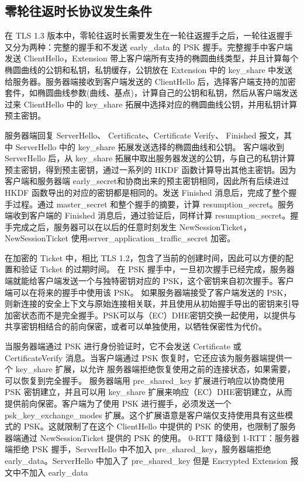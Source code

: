\subsection{零轮往返时长协议发生条件}

在 TLS 1.3 版本中，零轮往返时长需要发生在一轮往返握手之后，一轮往返握手又分为两种：完整的握手和不发送 early\_data 的 PSK 握手。完整握手中客户端发送 ClientHello，Extension 带上客户端所有支持的椭圆曲线类型，并且计算每个椭圆曲线的公钥和私钥，私钥缓存，公钥放在 Extension 中的 key\_share 中发送给服务器。服务器端接收到客户端发送的 ClientHello 后，选择客户端支持的加密套件，如椭圆曲线参数(曲线、基点)，计算自己的公钥和私钥，然后从客户端发送过来 ClientHello 中的 key\_share 拓展中选择对应的椭圆曲线公钥，并用私钥计算预主密钥。

服务器端回复 ServerHello、 Certificate、Certificate Verify、 Finished 报文，其中 ServerHello 中的 key\_share 拓展发送选择的椭圆曲线和公钥。
客户端收到 ServerHello 后，从 key\_share 拓展中取出服务器发送的公钥，与自己的私钥计算预主密钥，得到预主密钥，通过一系列的 HKDF 函数计算导出其他主密钥。因为客户端和服务器端 early\_secret和协商出来的预主密钥相同，因此所有后续进过 HKDF 函数导出的对应的密钥都是相同的。发送 Finished 消息后，完成了整个握手过程。通过 master\_secret 和整个握手的摘要，计算 resumption\_secret。服务端收到客户端的 Finished 消息后，通过验证后，同样计算 resumption\_secret。握手完成之后，服务器可以在以后的任意时刻发生 NewSessionTicket，NewSessionTicket 使用server\_application\_traffic\_secret 加密。

在加密的 Ticket 中，相比 TLS 1.2，包含了当前的创建时间，因此可以方便的配置和验证 Ticket 的过期时间。
在 PSK 握手中，一旦初次握手已经完成，服务器端就能给客户端发送一个与独特密钥对应的 PSK，这个密钥来自初次握手。客户端可以在将来的握手中使用该 PSK。 如果服务器端接受了客户端发送的 PSK，则新连接的安全上下文与原始连接相关联，并且使用从初始握手导出的密钥来引导加密状态而不是完全握手。PSK可以与（EC）DHE密钥交换一起使用，以提供与共享密钥相结合的前向保密，或者可以单独使用，以牺牲保密性为代价。

当服务器端通过 PSK 进行身份验证时，它不会发送 Certificate 或 CertificateVerify 消息。当客户端通过 PSK 恢复时，它还应该为服务器端提供一个 key\_share 扩展，以允许 服务器端拒绝恢复使用之前的连接状态，如果需要，可以恢复到完全握手。 服务器端用 pre\_shared\_key 扩展进行响应以协商使用 PSK 密钥建立，并且可以用 key\_share 扩展来响应（EC）DHE密钥建立，从而提供前向保密。客户端为了使用 PSK 进行握手，必须发送一个 psk\_key\_exchange\_modes 扩展。这个扩展语意是客户端仅支持使用具有这些模式的 PSK。这就限制了在这个 ClientHello 中提供的 PSK 的使用，也限制了服务器端通过 NewSessionTicket 提供的 PSK 的使用。
0-RTT 降级到 1-RTT：服务器端拒绝 PSK 握手，ServerHello 中不加入 pre\_shared\_key，服务器端拒绝 early\_data。ServerHello 中加入了 pre\_shared\_key 但是 Encrypted Extension 报文中不加入 early\_data